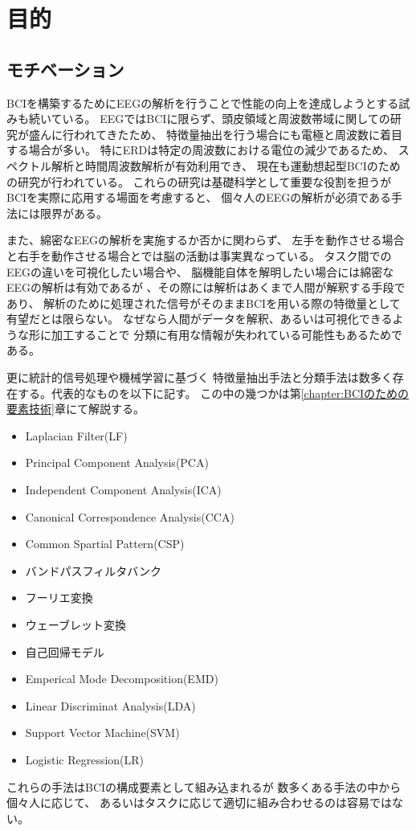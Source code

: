 \section{\mc 目的}
\subsection{\mc モチベーション}
BCIを構築するためにEEGの解析を行うことで性能の向上を達成しようとする試みも続いている\cite{脳波解析BCI,脳波分析BCI,ERSBCI}。
EEGではBCIに限らず、頭皮領域と周波数帯域に関しての研究が盛んに行われてきたため、
特徴量抽出を行う場合にも電極と周波数に着目する場合が多い。
特にERDは特定の周波数における電位の減少であるため、
スペクトル解析と時間周波数解析が有効利用でき、
現在も運動想起型BCIのための研究が行われている\cite{時間周波数解析の比較}。
これらの研究は基礎科学として重要な役割を担うが
BCIを実際に応用する場面を考慮すると、
個々人のEEGの解析が必須である手法には限界がある。

また、綿密なEEGの解析を実施するか否かに関わらず、
左手を動作させる場合と右手を動作させる場合とでは脳の活動は事実異なっている。
タスク間でのEEGの違いを可視化したい場合や、
脳機能自体を解明したい場合には綿密なEEGの解析は有効であるが
、その際には解析はあくまで人間が解釈する手段であり、
解析のために処理された信号がそのままBCIを用いる際の特徴量として有望だとは限らない。
なぜなら人間がデータを解釈、あるいは可視化できるような形に加工することで
分類に有用な情報が失われている可能性もあるためである。

更に統計的信号処理や機械学習に基づく
特徴量抽出手法と分類手法は数多く存在する。代表的なものを以下に記す。
この中の幾つかは第\ref{chapter:BCIのための要素技術}章にて解説する。
\begin{itemize}
    \item Laplacian Filter(LF)
    \item Principal Component Analysis(PCA)
    \item Independent Component Analysis(ICA)
    \item Canonical Correspondence Analysis(CCA)
    \item Common Spartial Pattern(CSP)
    \item バンドパスフィルタバンク
    \item フーリエ変換
    \item ウェーブレット変換
    \item 自己回帰モデル
    \item Emperical Mode Decomposition(EMD)
    \item Linear Discriminat Analysis(LDA)
    \item Support Vector Machine(SVM)
    \item Logistic Regression(LR)
\end{itemize}
これらの手法はBCIの構成要素として組み込まれるが
数多くある手法の中から個々人に応じて、
あるいはタスクに応じて適切に組み合わせるのは容易ではない。


